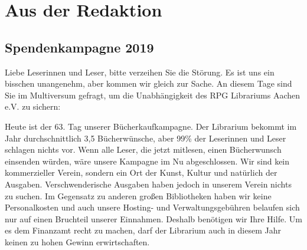 
%



%






%



\makemultititle
%

\section{Aus der Redaktion}

\subsection{Spendenkampagne 2019}
Liebe Leserinnen und Leser, bitte verzeihen Sie die Störung. Es ist uns ein bisschen unangenehm, aber kommen wir gleich zur Sache. An diesem Tage sind Sie im Multiversum gefragt, um die Unabhängigkeit des RPG Librariums Aachen e.V. zu sichern:

Heute ist der 63. Tag unserer Bücherkaufkampagne. Der Librarium bekommt im Jahr durchschnittlich 3,5 Bücherwünsche, aber 99\% der Leserinnen und Leser schlagen nichts vor. Wenn alle Leser, die jetzt mitlesen, einen Bücherwunsch einsenden würden, wäre unsere Kampagne im Nu abgeschlossen.
Wir sind kein kommerzieller Verein, sondern ein Ort der Kunst, Kultur und natürlich der Ausgaben. Verschwenderische Ausgaben haben jedoch in unserem Verein nichts zu suchen. Im Gegensatz zu anderen großen Bibliotheken haben wir keine Personalkosten und auch unsere Hosting- und Verwaltungsgebühren belaufen sich nur auf einen Bruchteil unserer Einnahmen. Deshalb benötigen wir Ihre Hilfe. Um es dem Finanzamt recht zu machen, darf der Librarium auch in diesem Jahr keinen zu hohen Gewinn erwirtschaften.

